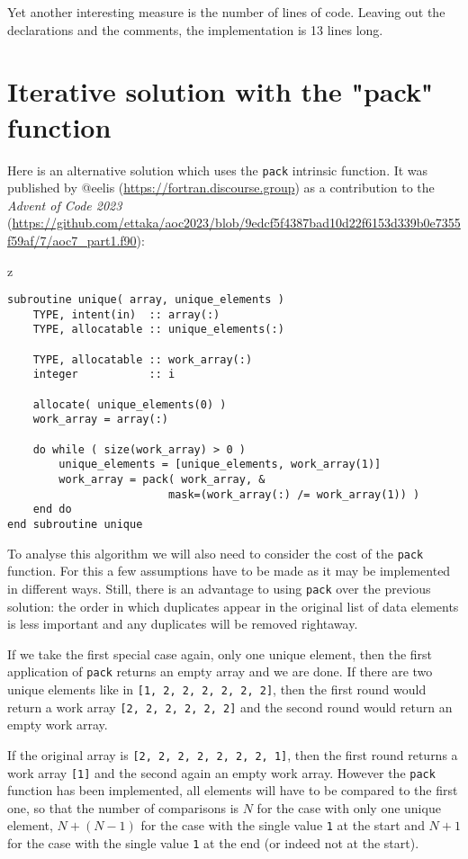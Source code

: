 \documentclass[onecolumn]{article}
\begin{document}
Yet another interesting measure is the number of lines of code. Leaving out the declarations and the comments, the implementation
is 13 lines long.

\section*{Iterative solution with the "pack" function}
Here is an alternative solution which uses the \verb+pack+ intrinsic function. It was published by @eelis (\url{https://fortran.discourse.group})
as a contribution to the \emph{Advent of Code 2023} (\url{https://github.com/ettaka/aoc2023/blob/9edcf5f4387bad10d22f6153d339b0e7355f59af/7/aoc7_part1.f90}):

z\begin{verbatim}
subroutine unique( array, unique_elements )
    TYPE, intent(in)  :: array(:)
    TYPE, allocatable :: unique_elements(:)

    TYPE, allocatable :: work_array(:)
    integer           :: i

    allocate( unique_elements(0) )
    work_array = array(:)

    do while ( size(work_array) > 0 )
        unique_elements = [unique_elements, work_array(1)]
        work_array = pack( work_array, &
                         mask=(work_array(:) /= work_array(1)) )
    end do
end subroutine unique
\end{verbatim}

To analyse this algorithm we will also need to consider the cost of the \verb+pack+ function. For this
a few assumptions have to be made as it may be implemented in different ways. Still, there is an
advantage to using \verb+pack+ over the previous solution: the order in which duplicates appear in
the original list of data elements is less important and any duplicates will be removed rightaway.

If we take the first special case again, only one unique element, then the first application of
\verb+pack+ returns an empty array and we are done. If there are two unique elements like in
\verb+[1, 2, 2, 2, 2, 2, 2]+, then the first round would return a work array \verb+[2, 2, 2, 2, 2, 2]+
and the second round would return an empty work array.

If the original array is \verb+[2, 2, 2, 2, 2, 2, 2, 1]+, then the first round returns a work array \verb+[1]+
and the second again an empty work array. However the \verb+pack+ function has been implemented,
all elements will have to be compared to the first one, so that the number of comparisons is
$N$ for the case with only one unique element, $N + (N-1)$ for the case with the single value \verb+1+
at the start and $N + 1$ for the case with the single value \verb+1+ at the end (or indeed not at the start).
\end{document}

